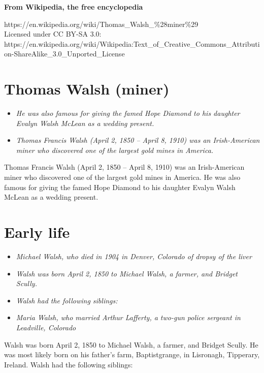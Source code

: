 \textbf{From Wikipedia, the free encyclopedia}

https://en.wikipedia.org/wiki/Thomas\_Walsh\_\%28miner\%29\\
Licensed under CC BY-SA 3.0:\\
https://en.wikipedia.org/wiki/Wikipedia:Text\_of\_Creative\_Commons\_Attribution-ShareAlike\_3.0\_Unported\_License

\section{Thomas Walsh (miner)}\label{thomas-walsh-miner}

\begin{itemize}
\item
  \emph{He was also famous for giving the famed Hope Diamond to his
  daughter Evalyn Walsh McLean as a wedding present.}
\item
  \emph{Thomas Francis Walsh (April 2, 1850 -- April 8, 1910) was an
  Irish-American miner who discovered one of the largest gold mines in
  America.}
\end{itemize}

Thomas Francis Walsh (April 2, 1850 -- April 8, 1910) was an
Irish-American miner who discovered one of the largest gold mines in
America. He was also famous for giving the famed Hope Diamond to his
daughter Evalyn Walsh McLean as a wedding present.

\section{Early life}\label{early-life}

\begin{itemize}
\item
  \emph{Michael Walsh, who died in 1904 in Denver, Colorado of dropsy of
  the liver}
\item
  \emph{Walsh was born April 2, 1850 to Michael Walsh, a farmer, and
  Bridget Scully.}
\item
  \emph{Walsh had the following siblings:}
\item
  \emph{Maria Walsh, who married Arthur Lafferty, a two-gun police
  sergeant in Leadville, Colorado}
\end{itemize}

Walsh was born April 2, 1850 to Michael Walsh, a farmer, and Bridget
Scully. He was most likely born on his father's farm, Baptistgrange, in
Lisronagh, Tipperary, Ireland. Walsh had the following siblings:

